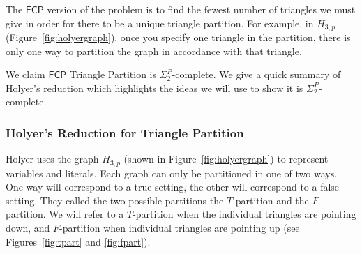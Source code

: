 \documentclass[runningheads,a4paper]{llncs}
\begin{document}
The $\mathsf{FCP}$ version of the problem is to find the fewest number of triangles we must give in order for there to be a unique triangle partition. For example, in $H_{3,p}$ (Figure~\ref{fig:holyergraph}), once you specify one triangle in the partition, there is only one way to partition the graph in accordance with that triangle.

We claim $\mathsf{FCP}$ Triangle Partition is $\Sigma_2^P$-complete. We give a quick summary of Holyer's reduction which highlights the ideas we will use to show it is $\Sigma_2^P$-complete. 

\subsubsection{Holyer's Reduction for Triangle Partition}
Holyer uses the graph $H_{3,p}$ (shown in Figure~\ref{fig:holyergraph}) to represent variables and literals. Each graph can only be partitioned in one of two ways. One way will correspond to a true setting, the other will correspond to a false setting. They called the two possible partitions the $T$-partition and the $F$-partition. We will refer to a $T$-partition when the individual triangles are pointing down, and $F$-partition when individual triangles are pointing up (see Figures~\ref{fig:tpart} and \ref{fig:fpart}).
\end{document}
